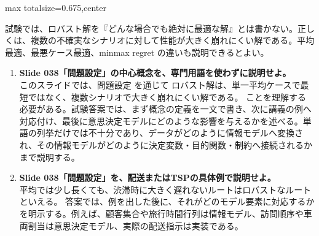 \begin{adjustbox}{max totalsize={\textwidth}{0.675\textheight},center}
\begin{minipage}{\textwidth}
\begin{minipage}[t]{0.485\textwidth}
試験では、ロバスト解を『どんな場合でも絶対に最適な解』とは書かない。正しくは、複数の不確実なシナリオに対して性能が大きく崩れにくい解である。平均最適、最悪ケース最適、minmax regret の違いも説明できるとよい。\par
{}
\begin{enumerate}
\item \textbf{Slide 038「問題設定」の中心概念を、専門用語を使わずに説明せよ。}\\このスライドでは、問題設定 を通じて ロバスト解は、単一平均ケースで最短ではなく、複数シナリオで大きく崩れにくい解である。 ことを理解する必要がある。試験答案では、まず概念の定義を一文で書き、次に講義の例へ対応付け、最後に意思決定モデルにどのような影響を与えるかを述べる。単語の列挙だけでは不十分であり、データがどのように情報モデルへ変換され、その情報モデルがどのように決定変数・目的関数・制約へ接続されるかまで説明する。
\item \textbf{Slide 038「問題設定」を、配送またはTSPの具体例で説明せよ。}\\平均では少し長くても、渋滞時に大きく遅れないルートはロバストなルートといえる。 答案では、例を出した後に、それがどのモデル要素に対応するかを明示する。例えば、顧客集合や旅行時間行列は情報モデル、訪問順序や車両割当は意思決定モデル、実際の配送指示は実装である。
\end{enumerate}
\end{minipage}
\end{minipage}
\end{adjustbox}

